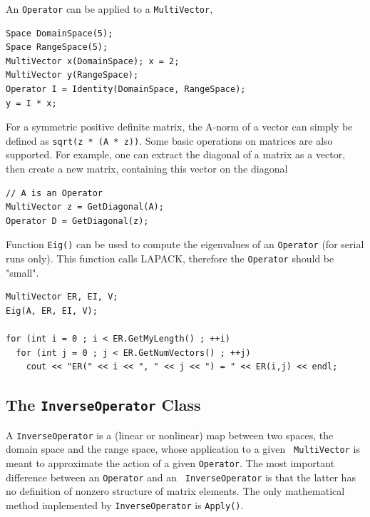 \documentclass{article}[11pt]
\begin{document}
An {\tt Operator} can be applied to a {\tt MultiVector},
\begin{verbatim}
Space DomainSpace(5);
Space RangeSpace(5);
MultiVector x(DomainSpace); x = 2;
MultiVector y(RangeSpace);
Operator I = Identity(DomainSpace, RangeSpace);
y = I * x;
\end{verbatim}

\smallskip

For a symmetric positive definite matrix, the A-norm of a vector can simply be
defined as \verb!sqrt(z * (A * z))!.
Some basic operations on matrices are also supported. For example,
one can extract the diagonal of a matrix as a vector, then create a new
matrix, containing this vector on the diagonal
\begin{verbatim}    
// A is an Operator
MultiVector z = GetDiagonal(A);
Operator D = GetDiagonal(z);
\end{verbatim}

Function {\tt Eig()} can be used to compute the eigenvalues of an
{\tt Operator}
(for serial runs only). This function calls LAPACK, therefore the
{\tt Operator} should be "small".
\begin{verbatim}    
MultiVector ER, EI, V;
Eig(A, ER, EI, V);

for (int i = 0 ; i < ER.GetMyLength() ; ++i)
  for (int j = 0 ; j < ER.GetNumVectors() ; ++j)
    cout << "ER(" << i << ", " << j << ") = " << ER(i,j) << endl;
\end{verbatim}

\subsection{The {\tt InverseOperator} Class}
\label{sec:inverseoperator}

A {\tt InverseOperator} is a (linear or nonlinear) map between two spaces, the
domain space and the range space, whose application to a given {\tt
  MultiVector} is meant to approximate the action of a given {\tt Operator}.
The most important difference between an {\tt Operator} and an {\tt
  InverseOperator} is that the latter has no definition of nonzero
  structure of matrix elements. The only mathematical method implemented
  by {\tt InverseOperator} is {\tt Apply()}.
\end{document}
